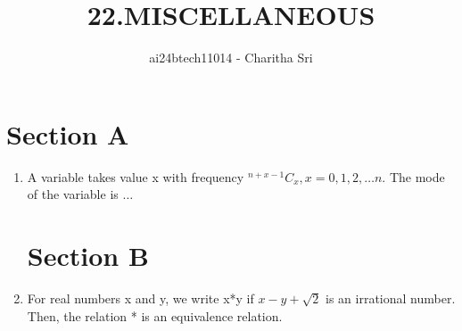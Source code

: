 \documentclass[journal,12pt,onecolumn]{IEEEtran}
\theoremstyle{remark}
\begin{document}

\vspace{3cm}

\title{22.MISCELLANEOUS}
\author{ai24btech11014 - Charitha Sri}

\maketitle
\bigskip       
\renewcommand{\thefigure}{\theenumi}
\renewcommand{\thetable}{\theenumi}

\section{Section A}

\begin{enumerate}
	
	\item A variable takes value x with frequency ${}^{n+x-1}C_{x},
		x=0,1,2,\dots n$. The mode of the variable is $\dots$
		\hfill{}
\section{Section B}
	\item For real numbers x and y, we write x*y if $x-y+\sqrt{2}$ is an irrational number. Then, the relation * is an equivalence relation.
		\hfill{}

\end{enumerate}
\end{document}
